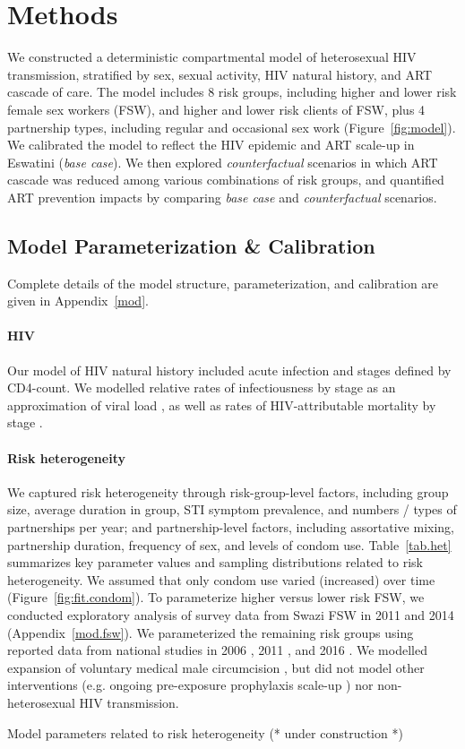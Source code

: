 \section*{Methods}\label{meth}
We constructed a deterministic compartmental model of heterosexual HIV transmission,
stratified by sex, sexual activity, HIV natural history, and ART cascade of care.
The model includes 8 risk groups,
including higher and lower risk female sex workers (FSW), and higher and lower risk clients of FSW,
plus 4 partnership types, including regular and occasional sex work (Figure~\ref{fig:model}).
We calibrated the model to reflect the HIV epidemic and ART scale-up in Eswatini (\emph{base case}).
We then explored \emph{counterfactual} scenarios in which
ART cascade was reduced among various combinations of risk groups,
and quantified ART prevention impacts by comparing \emph{base case} and \emph{counterfactual} scenarios.
\subsection*{Model Parameterization \& Calibration}\label{meth.param}
Complete details of the model structure, parameterization, and calibration are given in Appendix~\ref{mod}.
\paragraph{HIV}
Our model of HIV natural history included acute infection and stages defined by CD4-count.
We modelled relative rates of infectiousness by stage
as an approximation of viral load \cite{Wawer2005,Boily2009,Donnell2010},
as well as rates of HIV-attributable mortality by stage \cite{Badri2006,Anglaret2012,Mangal2017}.
\paragraph{Risk heterogeneity}
We captured risk heterogeneity through risk-group-level factors, including
group size, average duration in group, STI symptom prevalence, and numbers / types of partnerships per year;
and partnership-level factors, including
assortative mixing, partnership duration, frequency of sex, and levels of condom use.
Table~\ref{tab.het} summarizes key parameter values and sampling distributions related to risk heterogeneity.
We assumed that only condom use varied (increased) over time (Figure~\ref{fig:fit.condom}).
To parameterize higher versus lower risk FSW, we conducted exploratory analysis of
survey data from Swazi FSW in 2011 \cite{Baral2014} and 2014 \cite{EswKP2014} (Appendix~\ref{mod.fsw}).
We parameterized the remaining risk groups using reported data from national studies in
2006 \cite{SDHS2006}, 2011 \cite{SHIMS1}, and 2016 \cite{SHIMS2}.
We modelled expansion of voluntary medical male circumcision \cite{SHIMS2},
but did not model other interventions (e.g. ongoing pre-exposure prophylaxis scale-up \cite{EswCOP21})
nor non-heterosexual HIV transmission.
\begin{table}
  \centering
  \caption{Model parameters related to risk heterogeneity (* under construction *)}
  
  \label{tab.het}
\end{table}
